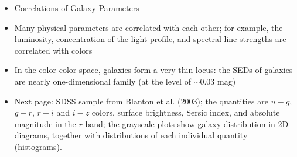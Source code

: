 \documentclass[letterpaper,landscape]{slides}
\begin{document}
\begin{slide}
{\begin{minipage}[t]{14cm}
\vskip -1in
\begin{itemize}
\item
{\large \color{red} Correlations of Galaxy Parameters}
\item
{\color{blue} Many physical parameters are correlated with each other}; for example,
the luminosity, concentration of the light profile, and spectral line 
strengths are correlated with colors
\item
In the color-color space, galaxies form a very thin locus: {\color{blue} the SEDs of
galaxies are nearly one-dimensional family} (at the level of $\sim$0.03 mag)
\item Next page: SDSS sample from Blanton et al. (2003); the quantities
are $u-g$, $g-r$, $r-i$ and $i-z$ colors, surface brightness, Sersic index,
and absolute magnitude in the $r$ band; the grayscale plots show galaxy 
distribution in 2D diagrams, together with distributions of each individual 
quantity (histograms).
\end{itemize}  

\end{minipage}}
\vfill 
\end{slide}



\begin{slide}
\begin{center}
\end{center}
\vfill
\end{slide}
\end{document}
